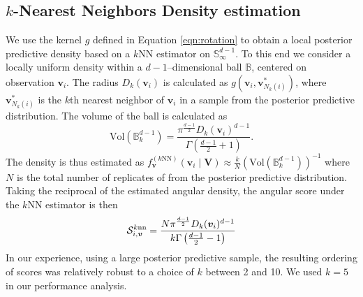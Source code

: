 \subsection{$k$-Nearest Neighbors Density estimation}
We use the kernel $g$ defined in Equation \ref{eqn:rotation} to obtain 
    a local posterior predictive density based on a $k$NN estimator 
    on $\mathbb{S}_{\infty}^{d-1}$. To this end we consider a locally 
    uniform density within a $d-1$--dimensional ball $\mathbb{B}$, centered on 
    observation $\bm{v}_i$.  The radius $D_{k}(\bm{v}_i)$ is calculated as 
    $g\left(\bm{v}_i, \bm{v}_{N_k(i)}^*\right)$, where $\bm{v}_{N_k(i)}^*$ is the $k$th nearest 
    neighbor of $\bm{v}_i$ in a sample from the 
    posterior predictive distribution. The volume of the ball is calculated as
    \begin{equation}
        \label{eqn:vol_sphere}
        \text{Vol}(\mathbb{B}_k^{d-1}) =
        \frac{\pi^{\frac{d-1}{2}}D_{k}(\bm{v}_i)^{d-1}}{
            \Gamma\left(\frac{d-1}{2} + 1\right)}.
    \end{equation}
    The density is thus estimated as 
    $f_{\bm{v}}^{(k\text{NN})}(\bm{v}_i\mid \bm{V}) \approx 
        \frac{k}{N}\left(\text{Vol}(\mathbb{B}_{k}^{d-1})\right)^{-1}$
    where $N$ is the total number of replicates of from the posterior predictive
    distribution.  Taking the reciprocal of the estimated angular density, 
    the angular score under the $k$NN estimator is then
    \begin{equation}
        \label{eqn:ad_knn_h}
        \mathcal{S}_{i,\bm{v}}^{\text{$k$nn}} = 
            \frac{N\pi^{\frac{d-1}{2}}D_{k}(\bm{v}_i)^{d-1}}{
            k\Gamma\left(\frac{d-1}{2} - 1\right)}
    \end{equation}
    In our experience, using a large posterior predictive sample,
    the resulting ordering of scores was relatively robust to a choice of $k$ 
    between 2 and 10.  We used $k = 5$ in our performance analysis.

